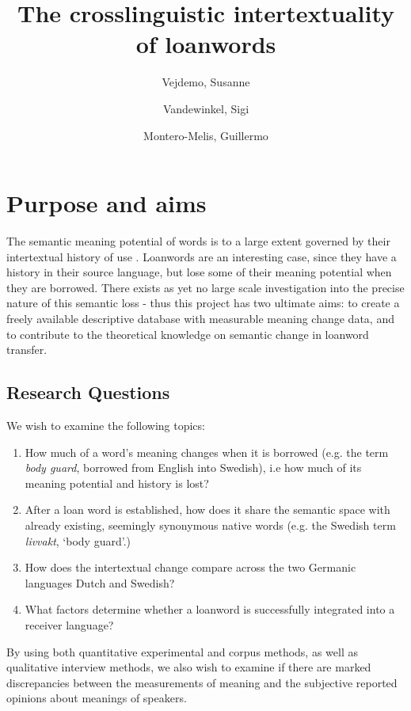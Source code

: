 \documentclass[a4paper]{article}
\title{The crosslinguistic intertextuality of loanwords}
\author{Vejdemo, Susanne \and Vandewinkel, Sigi \and Montero-Melis, Guillermo}
\begin{document}
\maketitle
\thispagestyle{fancy} %

\section{Purpose and aims}
The semantic meaning potential of words is to a large extent governed by their intertextual history of use \citep[see][]{Linell2005,Traugott2001}.
Loanwords are an interesting case, since they have a history in their source language, but lose some of their meaning potential when they are borrowed.
There exists as yet no large scale investigation into the precise nature of this semantic loss - thus this project has two ultimate aims: to create a freely available descriptive database with measurable meaning change data, and to contribute to the theoretical knowledge on semantic change in loanword transfer.

\subsection{Research Questions}

We wish to examine the following topics:
%
\begin{enumerate}
	\item  How much of a word's meaning changes when it is borrowed (e.g. the term \emph{body guard}, borrowed from English into Swedish), i.e how much of its meaning potential and history is lost?
	\item  After a loan word is established, how does it share the semantic space with already existing, seemingly synonymous native words (e.g. the Swedish term \emph{livvakt}, `body guard'.)
	\item How does the intertextual change compare across the two Germanic languages Dutch and Swedish?
	\item What factors determine whether a loanword is successfully integrated into a receiver language?
\end{enumerate}
%
By using both quantitative experimental and corpus methods, as well as qualitative interview methods, we also wish to examine if there are marked discrepancies between the measurements of meaning and the subjective reported opinions about meanings of speakers.
\end{document}
